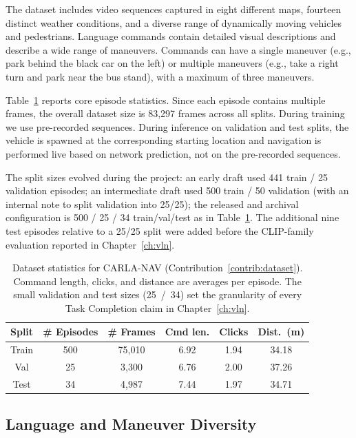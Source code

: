 The dataset includes video sequences captured in eight different maps, fourteen distinct weather conditions, and a diverse range of dynamically moving vehicles and pedestrians. Language commands contain detailed visual descriptions and describe a wide range of maneuvers. Commands can have a single maneuver (e.g., park behind the black car on the left) or multiple maneuvers (e.g., take a right turn and park near the bus stand), with a maximum of three maneuvers.

Table~\ref{table:data_stats} reports core episode statistics. Since each episode contains multiple frames, the overall dataset size is 83,297 frames across all splits. During training we use pre-recorded sequences. During inference on validation and test splits, the vehicle is spawned at the corresponding starting location and navigation is performed live based on network prediction, not on the pre-recorded sequences.

The split sizes evolved during the project: an early draft used 441 train / 25 validation episodes; an intermediate draft used 500 train / 50 validation (with an internal note to split validation into 25/25); the released and archival configuration is 500 / 25 / 34 train/val/test as in Table~\ref{table:data_stats}. The additional nine test episodes relative to a 25/25 split were added before the CLIP-family evaluation reported in Chapter~\ref{ch:vln}.

\begin{table}[ht]
\begin{center}
\begin{tabular}{|c|c|c|c|c|c|}
\hline
Split & \# Episodes & \# Frames & Cmd len. & Clicks & Dist.\ (m) \\ \hline
Train & 500 & 75,010 & 6.92 & 1.94 & 34.18 \\ \hline
Val   & 25  & 3,300  & 6.76 & 2.00 & 37.26 \\ \hline
Test  & 34  & 4,987  & 7.44 & 1.97 & 34.71 \\ \hline
\end{tabular}
\end{center}
\caption[CARLA-NAV dataset statistics]{Dataset statistics for CARLA-NAV (Contribution~\ref{contrib:dataset}). Command length, clicks, and distance are averages per episode. The small validation and test sizes (25~/~34) set the granularity of every Task Completion claim in Chapter~\ref{ch:vln}.}
\label{table:data_stats}
\end{table}

\subsection{Language and Maneuver Diversity}

